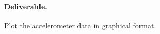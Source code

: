 \documentclass[10pt]{article}
\begin{document}
\paragraph{Deliverable.} Plot the accelerometer data in graphical format.
\end{document}
